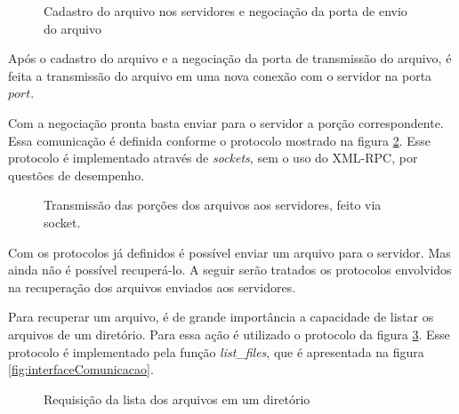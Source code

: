         \begin{figure}[!ht]
        
        \caption{Cadastro do arquivo nos servidores e negociação da porta de envio do arquivo}
        \label{fig:protSendFile}
        \end{figure}
        
        Após o cadastro do arquivo e a negociação da porta de transmissão do arquivo, é feita a transmissão do arquivo em uma nova conexão com o servidor na porta $port$.
        
        Com a negociação pronta basta enviar para o servidor a porção correspondente. Essa comunicação é definida conforme o protocolo mostrado na figura \ref{fig:protSendFileData}. Esse protocolo é implementado através de \emph{sockets}, sem o uso do XML-RPC, por questões de desempenho.
        
        \begin{figure}[!ht]
        \caption{Transmissão das porções dos arquivos aos servidores, feito via socket.}
        \label{fig:protSendFileData}
        \end{figure}
        
        
        Com os protocolos já definidos é possível enviar um arquivo para o servidor. Mas ainda não é possível recuperá-lo. A seguir serão tratados os protocolos envolvidos na recuperação dos arquivos enviados aos servidores.
        
        Para recuperar um arquivo, é de grande importância a capacidade de listar os arquivos de um diretório. Para essa ação é utilizado o protocolo da figura \ref{fig:protListFiles}. Esse protocolo é implementado pela função \textit{list\_files}, que é apresentada na figura \ref{fig:interfaceComunicacao}.
        
        \begin{figure}[!ht]
        \caption{Requisição da lista dos arquivos em um diretório}
        \label{fig:protListFiles}
        \end{figure}
        
